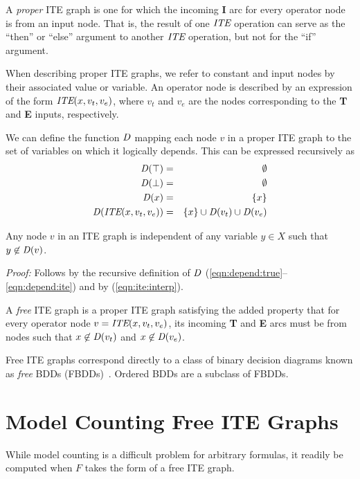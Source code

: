 \documentclass{llncs}
\newcommand{\tautology}{\top}
\newcommand{\nil}{\bot}
\newcommand{\ite}{\mbox{\it ITE}}
\newcommand{\ifarg}{\textbf{I}}
\newcommand{\thenarg}{\textbf{T}}
\newcommand{\elsearg}{\textbf{E}}
\newcommand{\depend}{{\it D}}
\begin{document}
A {\em proper} ITE graph is one for which the incoming \ifarg{} arc for every operator node is
from an input node.  That is, the result of one $\ite$ operation can
serve as the ``then'' or ``else'' argument to another $\ite$
operation, but not for the ``if'' argument.

When describing proper ITE graphs, we refer to constant and input
nodes by their associated value or variable.  An operator node is described by an expression of the form
$\ite(x, v_t, v_e)$, where $v_t$ and $v_e$ are the
nodes corresponding to the \thenarg{} and \elsearg{} inputs, respectively.

We can define the function $\depend$ mapping each node
$v$ in a proper ITE graph to the set of variables on which it logically depends.  This can be expressed recursively as
\begin{eqnarray}
\depend(\tautology) & = & \emptyset \label{eqn:depend:true}\\
\depend(\nil) & = & \emptyset \label{eqn:depend:false}\\
\depend(x) & = & \{x \} \label{eqn:depend:variable}\\
\depend(\ite(x, v_t, v_e)) & = & \{ x \} \cup \depend(v_t) \cup \depend(v_e) \label{eqn:depend:ite}
\end{eqnarray}  


\begin{lemma}
\label{lemma:independent:dset}
Any node $v$ in an ITE graph is independent of any variable $y \in X$ such that $y \not \in \depend(v)$.
\end{lemma}  
\noindent
{\em Proof:} Follows by the recursive definition of $\depend$ (\ref{eqn:depend:true}--\ref{eqn:depend:ite}) and by (\ref{eqn:ite:interp}).


A {\em free} ITE graph is a proper ITE graph satisfying the added
property that for every operator node $v = \ite(x, v_t, v_e)$, its
incoming \thenarg{} and \elsearg{} arcs must be from nodes such that
$x \not \in \depend(v_t)$ and $x \not \in \depend(v_e)$.

Free ITE graphs correspond directly to a class of binary decision diagrams known as {\em free} BDDs (FBDDs)~\cite{gergov:ieeetc:1994}.  Ordered BDDs are a subclass of FBDDs.

\section{Model Counting Free ITE Graphs}

While model counting is a difficult problem for arbitrary
formulas, it readily be computed when $F$ takes the form of a free
ITE graph.
\end{document}
